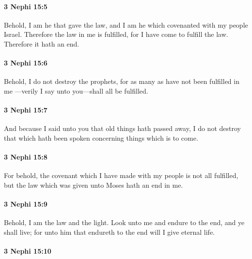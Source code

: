 		\paragraph{3 Nephi 15:5} %
			\label{3NEPHI-15-5}

			Behold, I am he that gave the law,
			and I am he which covenanted with my people Israel.
			Therefore the law in me is fulfilled,
			for I have come to fulfill the law.
			Therefore it hath an end.

		\paragraph{3 Nephi 15:6} %
			\label{3NEPHI-15-6}

			Behold, I do not destroy the prophets,
			for as many as have not been fulfilled in me
			---verily I say unto you---shall all be fulfilled.

		\paragraph{3 Nephi 15:7} %
			\label{3NEPHI-15-7}

			And because I said unto you that old things hath passed away,
			I do not destroy that which hath been spoken
			concerning things which is to come.

		\paragraph{3 Nephi 15:8} %
			\label{3NEPHI-15-8}

			For behold, the covenant which I have made with my people is not all fulfilled,
			but the law which was given unto Moses hath an end in me.

		\paragraph{3 Nephi 15:9} %
			\label{3NEPHI-15-9}

			Behold, I am the law and the light.
			Look unto me and endure to the end, and ye shall live;
			for unto him that endureth to the end will I give eternal life.

		\paragraph{3 Nephi 15:10} %
			\label{3NEPHI-15-10}

